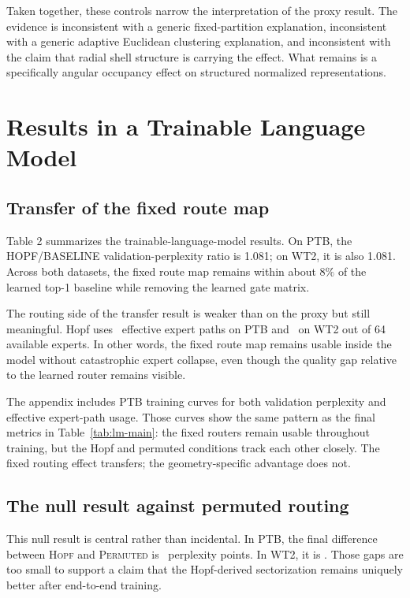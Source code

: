 \documentclass[10pt,letterpaper]{article}
\begin{document}
Taken together, these controls narrow the interpretation of the proxy result. The evidence is inconsistent with a generic fixed-partition explanation, inconsistent with a generic adaptive Euclidean clustering explanation, and inconsistent with the claim that radial shell structure is carrying the effect. What remains is a specifically angular occupancy effect on structured normalized representations.

\section{Results in a Trainable Language Model}
\subsection{Transfer of the fixed route map}
Table 2 summarizes the trainable-language-model results. On PTB, the HOPF/BASELINE validation-perplexity ratio is 1.081; on WT2, it is also 1.081. Across both datasets, the fixed route map remains within about \(8\%\) of the learned top-1 baseline while removing the learned gate matrix.

\begin{table}[t]
  \centering
  \caption{Main trainable-model result. Fixed angular routing is usable in a two-layer language model on both PTB and WT2, but the Hopf-derived assignment does not outperform the permuted fixed-routing null.}
  \label{tab:lm-main}
  \small
  
\end{table}

The routing side of the transfer result is weaker than on the proxy but still meaningful. Hopf uses \PaperPTBHopfEff\ effective expert paths on PTB and \PaperWTTwoHopfEff\ on WT2 out of 64 available experts. In other words, the fixed route map remains usable inside the model without catastrophic expert collapse, even though the quality gap relative to the learned router remains visible.

The appendix includes PTB training curves for both validation perplexity and effective expert-path usage. Those curves show the same pattern as the final metrics in Table~\ref{tab:lm-main}: the fixed routers remain usable throughout training, but the Hopf and permuted conditions track each other closely. The fixed routing effect transfers; the geometry-specific advantage does not.

\subsection{The null result against permuted routing}
\label{sec:null}
This null result is central rather than incidental. In PTB, the final difference between \textsc{Hopf} and \textsc{Permuted} is \PaperPTBHopfPermDelta\ perplexity points. In WT2, it is \PaperWTTwoHopfPermDelta. Those gaps are too small to support a claim that the Hopf-derived sectorization remains uniquely better after end-to-end training.
\end{document}
